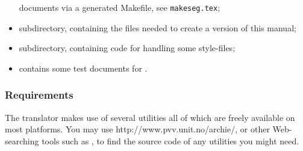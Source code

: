\begin{itemize}
\begin{changebar}
documents via a generated Makefile, see \verb/makeseg.tex/;
\end{changebar}
\item {} subdirectory, containing the files needed to create 
a version of this manual;
\item {} subdirectory, containing \Perl{} code for handling
some style-files;
\item {} contains some test documents for \latextohtml.
\end{itemize}

\htmlrule
\tableofchildlinks

\subsubsection{Requirements}%
\html{\\}%
The translator makes use of several utilities all of which 
are freely available on most platforms. 
You may use \htmladdnormallinkfoot{\html{ }}%
{http://www.pvv.unit.no/archie/}, 
or other Web-searching tools such as %
,
to find the source code of any utilities you might need.

